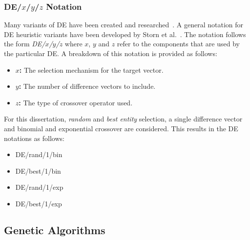 \subsubsection{DE/$x$/$y$/$z$ Notation}

Many variants of \acs{DE} have been created and researched~\cite{ref:mezura:2006}. A general notation for \acs{DE} heuristic variants have been developed by Storn et al.~\cite{ref:storn:1996, ref:storn:1997}. The notation follows the form \textit{DE/$x$/$y$/$z$} where $x$, $y$ and $z$ refer to the components that are used by the particular \acs{DE}. A breakdown of this notation is provided as follows:

\begin{itemize}
      \item \textbf{$x$:} The selection mechanism for the target vector.
      \item \textbf{$y$:} The number of difference vectors to include.
      \item \textbf{$z$:} The type of crossover operator used.
\end{itemize}

For this dissertation, \textit{random} and \textit{best entity} selection, a single difference vector and binomial and exponential crossover are considered. This results in the \acs{DE} notations as follows:

\begin{itemize}
      \item DE/rand/1/bin
      \item DE/best/1/bin
      \item DE/rand/1/exp
      \item DE/best/1/exp
\end{itemize}

\subsection{Genetic Algorithms}\label{sec:heuristics:mh:ga}

